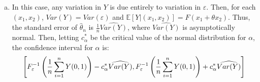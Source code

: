 \documentclass{article}
\newcommand{\est}[1]{\frac{1}{\lowercase{#1}}\sum_{i=1}^{\lowercase{#1}}}
\newcommand{\that}{\hat{\theta}_n}
\newcommand{\E}[1]{\mathbb{E}\left[#1\right]}%
\begin{document}
\begin{enumerate}[(a)]
    \item In this case, any variation in $Y$ is due entirely to variation in $\varepsilon$. Then, for each $(x_1, x_2)$, $Var(Y) = Var(\varepsilon)$ and $\E{Y|(x_1, x_2)} = F(x_1 + \theta x_2)$. Thus, the standard error of $\that$ is $\frac{1}{n}\widehat{Var(Y)}$, where $\widehat{Var(Y)}$ is asymptotically normal. Then, letting $c^*_\alpha$ be the critical value of the normal distribution for $\alpha$, the confidence interval for $\alpha$ is:\[
        \left[F_\varepsilon^{-1}\left(\est{n}Y(0,1)\right) - c^*_\alpha\widehat{Var(Y)}, F_\varepsilon^{-1}\left(\est{n}Y(0,1)\right) + c^*_\alpha\widehat{Var(Y)}\right]
    \]
\end{enumerate}

\end{document}
